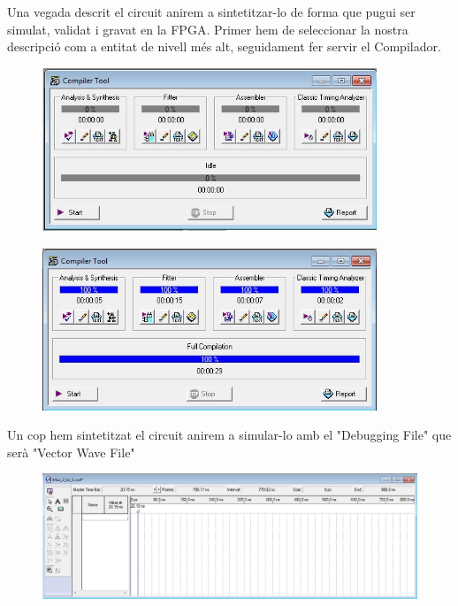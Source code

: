 \documentclass[12pt, a4papre]{article}
\begin{document}
	Una vegada descrit el circuit anirem a sintetitzar-lo de forma que pugui ser
simulat, validat i gravat en la FPGA. Primer hem de seleccionar la nostra descripció com a entitat de nivell més alt, seguidament fer servir el Compilador.
		\begin{figure}[H]
		\begin{center}
		\includegraphics[width=100mm]{simulador.jpeg}
		\end{center}
	\end{figure}
	\begin{figure}[H]
		\begin{center}
		\includegraphics[width=100mm]{simuladorfet.jpeg}
		\end{center}
	\end{figure}
	
	Un cop hem sintetitzat el circuit anirem a simular-lo amb el "Debugging File" que serà "Vector Wave File"
	
	\begin{figure}[H]
		\begin{center}
		\includegraphics[width=140mm]{waveform.jpeg}
		\end{center}
	\end{figure}
	
\end{document}
